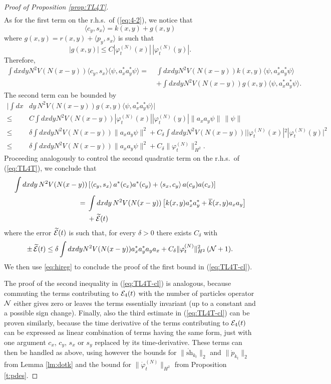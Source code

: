 \documentclass[11pt,a4paper]{article}
\newcommand{\wt}{\widetilde}
\newcommand{\cE}{{\cal E}}
\newcommand{\cN}{{\cal N}}
\begin{document}
\begin{proof}[Proof of Proposition \ref{prop:TL4T}]
\[\begin{split}
\end{split} \]
As for the first term on the r.h.s.\ of (\ref{eq:4-2}), we notice that 
\[ \langle c_y , s_x \rangle = k (x,y) + g (x,y) \]
where $g (x,y) = r(x,y) + \langle p_y , s_x \rangle$ is such that
\[ |g (x,y) | \leq C |\varphi_t^{(N)} (x)| \, | \varphi_t^{(N)} (y)|. \]
Therefore,
\[ \begin{split} 
\int dx dy N^2 V(N (x-y)) \langle c_y , s_x \rangle \langle \psi , a^*_x a^*_y \psi \rangle =\; & \int dx dy N^2 V(N (x-y)) k(x,y)  \langle \psi , a^*_x a^*_y \psi \rangle \\ &+ \int dx dy N^2 V(N (x-y)) g(x,y) \langle \psi , a^*_x a^*_y \psi \rangle.
\end{split} \]
The second term can be bounded by
\[ \begin{split} 
\Big| \int dx &dy  \, N^2 V(N (x-y)) g (x,y) \langle \psi , a^*_x a^*_y \psi \rangle \Big| \\  \leq \; &C \int dx dy N^2 V(N (x-y)) |\varphi_t^{(N)} (x)| |\varphi_t^{(N)} (y)| \|  a_x a_y \psi \| \, \| \psi \| \\ \leq \; &\delta \int dx dy N^2 V(N (x-y)) \| a_x a_y \psi \|^2 + C_\delta \int dx dy N^2 V(N(x-y)) | |\varphi_t^{(N)} (x)|^2 |\varphi_t^{(N)} (y)|^2  \\ \leq \; & \delta \int dx dy N^2 V(N(x-y)) \| a_x a_y \psi \|^2 + C_\delta \| \varphi_t^{(N)} \|_{H^2}^2.  \end{split} \]
Proceeding analogously to control the second quadratic term on the r.h.s.\ of (\ref{eq:TL4T}), we conclude that 
\[ \begin{split} 
\int dx dy \, N^2 V (N (x-y)) & \left[ \langle c_y, s_x \rangle \,  a^* (c_x) a^* (c_y)  + \langle s_x, c_y \rangle \, a (c_y)  a(c_x) \right] \\  = \; & \int dx dy \, N^2 V(N(x-y))  \left[ k(x,y) a^*_x a^*_y + \overline{k} (x,y) a_x a_y \right] \\ &+ \wt{\cE} (t) \end{split} \]
where the error $\wt{\cE} (t)$ is such that, for every $\delta >0$ there exists $C_\delta$ with 
\[ \pm \, \wt{\cE} (t) \leq  \delta \int dx dy N^2 V(N (x-y)) a_x^* a_y^* a_y a_x + C_\delta \| \varphi_t^{(N)}  \|_{H^2}^2 \,  (\cN + 1). \]
We then use \eqref{eq:hireg} to conclude the proof of the first bound in (\ref{eq:TL4T-cl}).

The proof of the second inequality in (\ref{eq:TL4T-cl}) is analogous, because commuting the terms contributing to $\cE_4 (t)$ with the number of particles operator $\cN$ either gives zero or leaves the terms essentially invariant (up to a constant and a possible sign change). Finally, also the third estimate in (\ref{eq:TL4T-cl}) can be proven similarly, because the time derivative of the terms contributing to $\cE_4 (t)$ can be expressed as linear combination of terms having the same form, just with one argument $c_x$, $c_y$, $s_x$ or $s_y$ replaced by its time-derivative. These terms can then be handled as above, using however the bounds for $\| \dot{\text{sh}}_{k_t} \|_2$ and $\| \dot{p}_{k_t} \|_2$ from Lemma \ref{lm:dotk} and the bound for $\| \dot{\varphi}_t^{(N)} \|_{H^2}$ from Proposition \ref{t:pdes}.
\end{proof}
\end{document}
